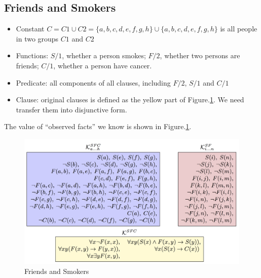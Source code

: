 
\subsection{Friends and Smokers}
\begin{itemize}
    \item Constant $C=C1 \cup C2=\{a,b,c,d,e,f,g,h\}\cup \{a,b,c,d,e,f,g,h\}$ is all people in two groups $C1$ and $C2$
    \item Functions: $S/1$, whether a person smokes; $F/2$, whether two persons are friends; $C/1$, whether a person have cancer.
    \item Predicate: all components of all clauses, including $F/2$, $S/1$ and $C/1$
    \item Clause: original clauses is defined as the yellow part of Figure.\ref{fig:example}. We need transfer them into disjunctive form.
\end{itemize}

The value of ``observed facts'' we know is shown in Figure.\ref{fig:example}.

\begin{figure}
    \centering
    \includegraphics[width=.7\textwidth]{img/example.png}
    \caption{Friends and Smokers}
    \label{fig:example}
\end{figure}

